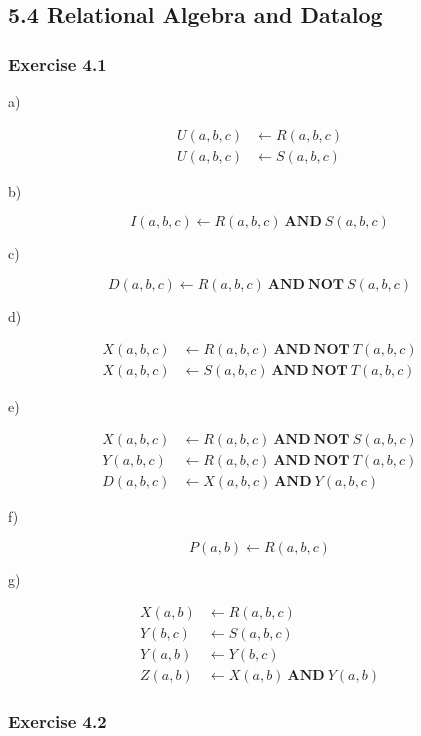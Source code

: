 \documentclass[../../main.tex]{subfiles}
\begin{document}
\subsection*{5.4 Relational Algebra and Datalog}

\subsubsection*{Exercise 4.1}

a)

\begin{align*}
  U(a, b, c) &\leftarrow R(a, b, c) \\
  U(a, b, c) &\leftarrow S(a, b, c)
\end{align*}

b)

$$
I(a, b, c) \leftarrow R(a, b, c) \ \mathbf{AND} \ S(a, b, c)
$$

c)

$$
D(a, b , c) \leftarrow R(a, b, c) \ \mathbf{AND \ NOT} \ S(a, b, c)
$$

d)

\begin{align*}
  X(a, b, c) &\leftarrow R(a, b, c) \ \mathbf{AND \ NOT} \ T(a, b, c) \\
  X(a, b, c) &\leftarrow S(a, b, c) \ \mathbf{AND \ NOT} \ T(a, b, c)
\end{align*}

e)

\begin{align*}
  X(a, b, c) &\leftarrow R(a, b, c) \ \mathbf{AND \ NOT} \ S(a, b, c) \\
  Y(a, b, c) &\leftarrow R(a, b, c) \ \mathbf{AND \ NOT} \ T(a, b, c) \\
  D(a, b, c) &\leftarrow X(a, b, c) \ \mathbf{AND} \ Y(a, b, c)
\end{align*}

f)

$$
P(a, b) \leftarrow R(a, b, c)
$$

g)

\begin{align*}
  X(a, b) &\leftarrow R(a, b, c)\\
  Y(b, c) &\leftarrow S(a, b, c) \\
  Y(a, b) &\leftarrow Y(b, c) \\
  Z(a, b) &\leftarrow X(a, b) \ \mathbf{AND} \ Y(a, b)
\end{align*}

\subsubsection*{Exercise 4.2}
\end{document}
